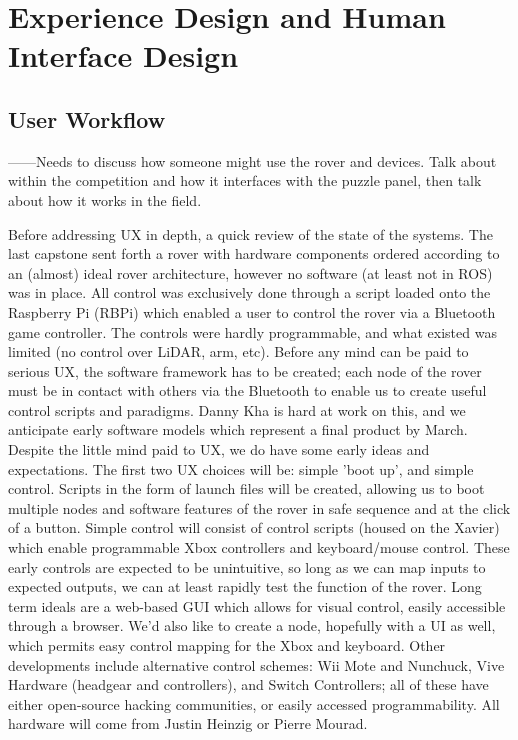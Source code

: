 \documentclass[a4paper, 10pt]{article}
\begin{document}
\pagebreak
	




\section{Experience Design and Human Interface Design}
	\subsection{User Workflow}
	------Needs to discuss how someone might use the rover and devices. Talk about within the competition and how it interfaces with the puzzle panel, then talk about how it works in the field. 
		
		
	Before addressing UX in depth, a quick review of the state of the systems. The last capstone sent forth a rover with hardware components ordered according to an (almost) ideal rover architecture, however no software (at least not in ROS) was in place. All control was exclusively done through a script loaded onto the Raspberry Pi (RBPi) which enabled a user to control the rover via a Bluetooth game controller. The controls were hardly programmable, and what existed was limited (no control over LiDAR, arm, etc). Before any mind can be paid to serious UX, the software framework has to be created; each node of the rover must be in contact with others via the Bluetooth to enable us to create useful control scripts and paradigms. Danny Kha is hard at work on this, and we anticipate early software models which represent a final product by March. 
Despite the little mind paid to UX, we do have some early ideas and expectations. The first two UX choices will be: simple 'boot up', and simple control. Scripts in the form of launch files will be created, allowing us to boot multiple nodes and software features of the rover in safe sequence and at the click of a button. Simple control will consist of control scripts (housed on the Xavier) which enable programmable Xbox controllers and keyboard/mouse control. These early controls are expected to be unintuitive, so long as we can map inputs to expected outputs, we can at least rapidly test the function of the rover. 
Long term ideals are a web-based GUI which allows for visual control, easily accessible through a browser. We'd also like to create a node, hopefully with a UI as well, which permits easy control mapping for the Xbox and keyboard. Other developments include alternative control schemes: Wii Mote and Nunchuck, Vive Hardware (headgear and controllers), and Switch Controllers; all of these have either open-source hacking communities, or easily accessed programmability. All hardware will come from Justin Heinzig or Pierre Mourad. 
\end{document}
